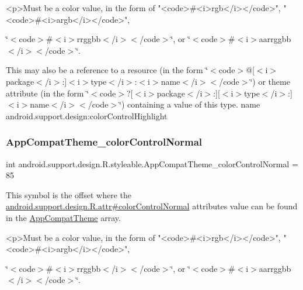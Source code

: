 \begin{DoxyVerb}      <p>Must be a color value, in the form of "<code>#<i>rgb</i></code>", "<code>#<i>argb</i></code>",
\end{DoxyVerb}
 \char`\"{}$<$code$>$\#$<$i$>$rrggbb$<$/i$>$$<$/code$>$\char`\"{}, or \char`\"{}$<$code$>$\#$<$i$>$aarrggbb$<$/i$>$$<$/code$>$\char`\"{}. 

This may also be a reference to a resource (in the form \char`\"{}$<$code$>$@\mbox{[}$<$i$>$package$<$/i$>$\+:\mbox{]}$<$i$>$type$<$/i$>$\+:$<$i$>$name$<$/i$>$$<$/code$>$\char`\"{}) or theme attribute (in the form \char`\"{}$<$code$>$?\mbox{[}$<$i$>$package$<$/i$>$\+:\mbox{]}\mbox{[}$<$i$>$type$<$/i$>$\+:\mbox{]}$<$i$>$name$<$/i$>$$<$/code$>$\char`\"{}) containing a value of this type.  name android.\+support.\+design\+:color\+Control\+Highlight \mbox{\label{classandroid_1_1support_1_1design_1_1R_1_1styleable_acb676a1a9b146706ffe3ae4186403c10}} 
\subsubsection{\texorpdfstring{App\+Compat\+Theme\+\_\+color\+Control\+Normal}{AppCompatTheme\_colorControlNormal}}
{\footnotesize\ttfamily int android.\+support.\+design.\+R.\+styleable.\+App\+Compat\+Theme\+\_\+color\+Control\+Normal = 85\hspace{0.3cm}{\ttfamily [static]}}

This symbol is the offset where the \hyperlink{classandroid_1_1support_1_1design_1_1R_1_1attr_a19fe8c83cad1d93f29836a533b5011d6}{android.\+support.\+design.\+R.\+attr\#color\+Control\+Normal} attribute\textquotesingle{}s value can be found in the \hyperlink{classandroid_1_1support_1_1design_1_1R_1_1styleable_afb351dc8de20cbd4c89abe360373010c}{App\+Compat\+Theme} array.

\begin{DoxyVerb}      <p>Must be a color value, in the form of "<code>#<i>rgb</i></code>", "<code>#<i>argb</i></code>",
\end{DoxyVerb}
 \char`\"{}$<$code$>$\#$<$i$>$rrggbb$<$/i$>$$<$/code$>$\char`\"{}, or \char`\"{}$<$code$>$\#$<$i$>$aarrggbb$<$/i$>$$<$/code$>$\char`\"{}. 

